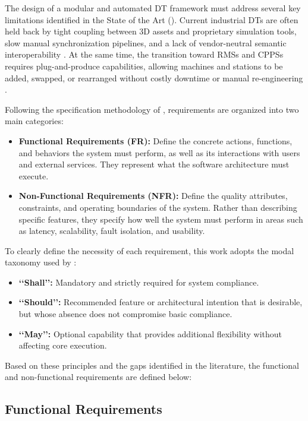 The design of a modular and automated \gls{DT} framework must address several key limitations identified in the State of the Art (). Current industrial \glspl{DT} are often held back by tight coupling between 3D assets and proprietary simulation tools, slow manual synchronization pipelines, and a lack of vendor-neutral semantic interoperability \cite{Alexopoulos2025,Schaper2025}. At the same time, the transition toward \glspl{RMS} and \glspl{CPPS} requires plug-and-produce capabilities, allowing machines and stations to be added, swapped, or rearranged without costly downtime or manual re-engineering \cite{Rocha2024}.

Following the specification methodology of \textcite{Alemao2022}, requirements are organized into two main categories:
\begin{itemize}
    \item \textbf{Functional Requirements (FR):} Define the concrete actions, functions, and behaviors the system must perform, as well as its interactions with users and external services. They represent what the software architecture must execute.
    \item \textbf{Non-Functional Requirements (NFR):} Define the quality attributes, constraints, and operating boundaries of the system. Rather than describing specific features, they specify how well the system must perform in areas such as latency, scalability, fault isolation, and usability.
\end{itemize}

To clearly define the necessity of each requirement, this work adopts the modal taxonomy used by \textcite{Alemao2022}:
\begin{itemize}
    \item \textbf{‘‘Shall’’:} Mandatory and strictly required for system compliance.
    \item \textbf{‘‘Should’’:} Recommended feature or architectural intention that is desirable, but whose absence does not compromise basic compliance.
    \item \textbf{‘‘May’’:} Optional capability that provides additional flexibility without affecting core execution.
\end{itemize}

Based on these principles and the gaps identified in the literature, the functional and non-functional requirements are defined below:

\subsection{Functional Requirements}

